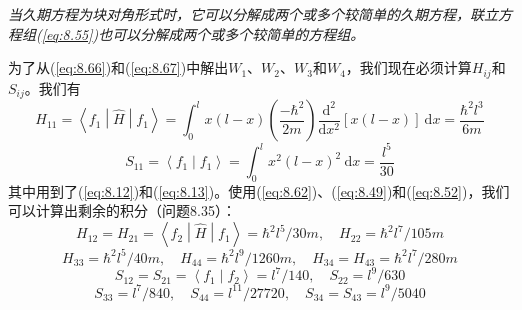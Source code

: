 \begin{examplebox}
        \textit{当久期方程为块对角形式时，它可以分解成两个或多个较简单的久期方程，联立方程组(\ref{eq:8.55})也可以分解成两个或多个较简单的方程组。}

        为了从(\ref{eq:8.66})和(\ref{eq:8.67})中解出$W_1$、$W_2$、$W_3$和$W_4$，我们现在必须计算$H_{ij}$和$S_{ij}$。我们有
        \begin{equation*}
            H_{11} = \left\langle f_1 \middle| \hat{H} \middle| f_1 \right\rangle = \int_0^l x(l-x)\left(\frac{-\hbar^2}{2m}\right)\frac{\mathrm{d}^2}{\mathrm{d}x^2}\left[x(l-x)\right]\:\mathrm{d}x = \frac{\hbar^2 l^3}{6m}
        \end{equation*}
        \begin{equation*}
            S_{11} = \left\langle f_1 \middle| f_1 \right\rangle = \int_0^l x^2(l-x)^2\:\mathrm{d}x = \frac{l^5}{30}
        \end{equation*}
        其中用到了(\ref{eq:8.12})和(\ref{eq:8.13})。使用(\ref{eq:8.62})、(\ref{eq:8.49})和(\ref{eq:8.52})，我们可以计算出剩余的积分（问题8.35）：
        \begin{equation*}
            H_{12} = H_{21} = \left\langle f_2 \middle| \hat{H} \middle| f_1 \right\rangle = \hbar^2 l^5/30m, \quad H_{22} = \hbar^2 l^7/105m
        \end{equation*}
        \begin{equation*}
            H_{33} = \hbar^2 l^5/40m, \quad H_{44} = \hbar^2 l^9/1260m, \quad H_{34} = H_{43} = \hbar^2 l^7/280m
        \end{equation*}
        \begin{equation*}
            S_{12} = S_{21} = \left\langle f_1 \middle| f_2 \right\rangle = l^7/140, \quad S_{22} = l^9/630
        \end{equation*}
        \begin{equation*}
            S_{33} = l^7/840, \quad S_{44} = l^{11}/27720, \quad S_{34} = S_{43} = l^9/5040
        \end{equation*}


\end{examplebox}
